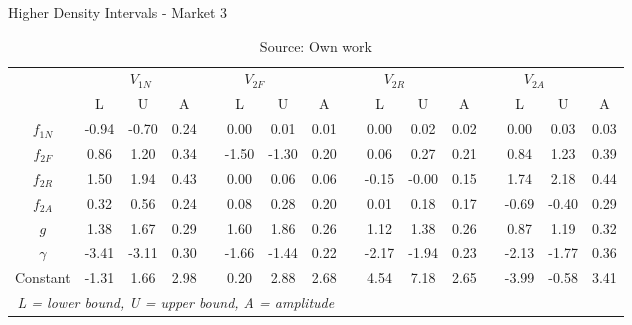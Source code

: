 \begin{table}
\caption{Higher Density Intervals -  Market 3}
\centering
\begin{tabular}{cccccccccccccccc}
  \toprule
 & \multicolumn{3}{c}{$V_{1N}$} & \multicolumn{3}{c}{$V_{2F}$} && \multicolumn{3}{c}{$V_{2R}$} && \multicolumn{3}{c}{$V_{2A}$}\\ 
\cline{2-4} \cline{6-8} \cline{10-12} \cline{14-16}
            & L  & U   & A &&  L  & U   & A &&  L  & U   & A &&  L  & U   & A\\
  \hline
  $f_{1N}$  & -0.94 & -0.70 & 0.24 && 0.00  & 0.01  & 0.01 && 0.00  & 0.02  & 0.02 && 0.00  & 0.03  & 0.03 \\ 
  $f_{2F}$  & 0.86  & 1.20  & 0.34 && -1.50 & -1.30 & 0.20 && 0.06  & 0.27  & 0.21 && 0.84  & 1.23  & 0.39 \\ 
  $f_{2R}$  & 1.50  & 1.94  & 0.43 && 0.00  & 0.06  & 0.06 && -0.15 & -0.00 & 0.15 && 1.74  & 2.18  & 0.44 \\ 
  $f_{2A}$  & 0.32  & 0.56  & 0.24 && 0.08  & 0.28  & 0.20 && 0.01  & 0.18  & 0.17 && -0.69 & -0.40 & 0.29 \\ 
  $g$       & 1.38  & 1.67  & 0.29 && 1.60  & 1.86  & 0.26 && 1.12  & 1.38  & 0.26 && 0.87  & 1.19  & 0.32 \\ 
  $\gamma$  & -3.41 & -3.11 & 0.30 && -1.66 & -1.44 & 0.22 && -2.17 & -1.94 & 0.23 && -2.13 & -1.77 & 0.36 \\ 
  Constant  & -1.31 & 1.66  & 2.98 && 0.20  & 2.88  & 2.68 && 4.54  & 7.18  & 2.65 && -3.99 & -0.58 & 3.41 \\ 
  \hline
  \multicolumn{8}{c}{\textit{L = lower bound, U = upper bound, A = amplitude}}\\
  \bottomrule
 \end{tabular}
\caption*{Source: Own work}
\end{table}